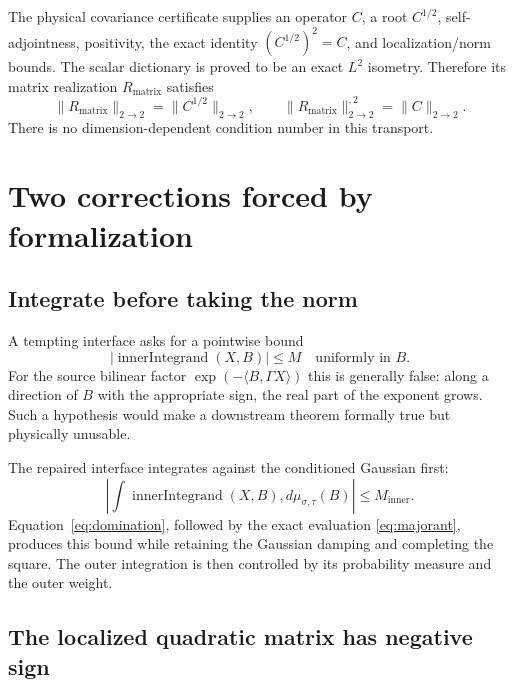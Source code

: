 \documentclass[11pt,a4paper]{article}
\theoremstyle{definition}
\newcommand{\opnorm}[1]{\lVert #1\rVert_{2\to2}}
\begin{document}
The physical covariance certificate supplies an operator $C$, a root
$C^{1/2}$, self-adjointness, positivity, the exact identity
$(C^{1/2})^2=C$, and localization/norm bounds.  The scalar dictionary is
proved to be an exact $L^2$ isometry.  Therefore its matrix realization
$R_{\mathrm{matrix}}$ satisfies
\begin{equation}\label{eq:norms}
 \opnorm{R_{\mathrm{matrix}}}=\opnorm{C^{1/2}},
 \qquad
 \opnorm{R_{\mathrm{matrix}}}^{,2}=\opnorm{C}.
\end{equation}
There is no dimension-dependent condition number in this transport.

\section{Two corrections forced by formalization}

\subsection{Integrate before taking the norm}

A tempting interface asks for a pointwise bound
\[
 |\operatorname{innerIntegrand}(X,B)|\le M
 \quad\text{uniformly in }B.
\]
For the source bilinear factor $\exp(-\langle B,\Gamma X\rangle)$ this is
generally false: along a direction of $B$ with the appropriate sign, the real
part of the exponent grows.  Such a hypothesis would make a downstream
theorem formally true but physically unusable.

The repaired interface integrates against the conditioned Gaussian first:
\begin{equation}\label{eq:integrated}
 \left|\int \operatorname{innerIntegrand}(X,B),d\mu_{\sigma,\tau}(B)\right|
 \le M_{\mathrm{inner}}.
\end{equation}
Equation~\eqref{eq:domination}, followed by the exact evaluation
\eqref{eq:majorant}, produces this bound while retaining the Gaussian damping
and completing the square.  The outer integration is then controlled by its
probability measure and the outer weight.

\subsection{The localized quadratic matrix has negative sign}
\end{document}

